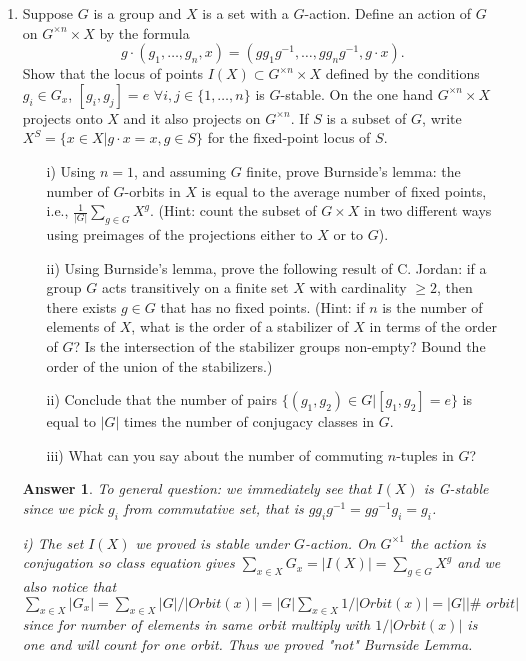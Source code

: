 \documentclass[11pt,leqno]{article}
\newcommand{\<}[1]{{\langle}#1 {\rangle}}
\theoremstyle{plain}
\newtheorem*{answer*}{Answer}
\theoremstyle{definition}
\theoremstyle{remark}
\numberwithin{equation}{section}
\begin{document}
\begin{enumerate}
    
\item Suppose $G$ is a group and $X$ is a set with a $G$-action.  Define an action of $G$ on $G^{\times n} \times X$ by the formula
    \[
    g \cdot (g_1,\ldots,g_n,x) = (gg_1g^{-1},\ldots,gg_ng^{-1},g \cdot x).
    \]
    Show that the locus of points $I{(X)} \subset G^{\times n} \times X$ defined by the conditions $g_i \in G_x$, $[g_i,g_j] = e$ $\forall i,j \in \{1,\ldots,n\}$ is $G$-stable.  On the one hand $G^{\times n} \times X$ projects onto $X$ and it also projects on $G^{\times n}$.  If $S$ is a subset of $G$, write $X^S = \{ x \in X | g \cdot x = x, g \in S\}$ for the fixed-point locus of $S$.
    \begin{itemize}[noitemsep,topsep=1pt]
    \item[i)] Using $n = 1$, and assuming $G$ finite, prove Burnside's lemma: the number of $G$-orbits in $X$ is equal to the average number of fixed points, i.e., $\frac{1}{|G|} \sum_{g \in G} X^{g}$.  (Hint: count the subset of $G \times X$ in two different ways using preimages of the projections either to $X$ or to $G$).
    \item[ii)] Using Burnside's lemma, prove the following result of C. Jordan: if a group $G$ acts transitively on a finite set $X$ with cardinality $\geq 2$, then there exists $g \in G$ that has no fixed points.  (Hint: if $n$ is the number of elements of $X$, what is the order of a stabilizer of $X$ in terms of the order of $G$?  Is the intersection of the stabilizer groups non-empty?  Bound the order of the union of the stabilizers.)
    \item[ii)] Conclude that the number of pairs $\{(g_1,g_2) \in G | [g_1,g_2] = e\}$ is equal to $|G|$ times the number of conjugacy classes in $G$.
    \item[iii)] What can you say about the number of commuting $n$-tuples in $G$?
    \end{itemize}
        \begin{answer*}
     To general question: we immediately see that $I(X)$ is G-stable since we pick $g_i $ from commutative set, that is $gg_ig^{-1}=gg^{-1}g_i=g_i$. 
     
     i) The set $I(X)$ we proved is stable under $G$-action. On $G^{\times 1}$ the action is conjugation so class equation gives $\sum_{x \in X} G_x=|I(X)|=\sum_{g \in G} X^{g}$ and we also notice that $\sum_{x \in X} |G_x|=\sum_{x \in X} |G|/|Orbit(x)|=|G|\sum_{x \in X} 1/|Orbit(x)|=|G||\textrm{# }orbit| $ since for number of elements in same orbit multiply with $1/|Orbit(x)|$ is one and will count for one orbit. Thus we proved "not" Burnside Lemma.
     

\end{answer*}
\end{enumerate}
\end{document}
